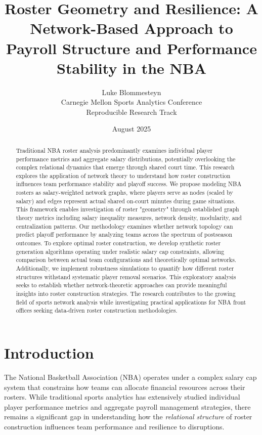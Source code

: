 \documentclass[11pt]{article}
\title{Roster Geometry and Resilience: A Network-Based Approach to Payroll Structure and Performance Stability in the NBA}
\author{Luke Blommesteyn\\
Carnegie Mellon Sports Analytics Conference\\
Reproducible Research Track}
\date{August 2025}
\begin{document}
\maketitle

\begin{abstract}
Traditional NBA roster analysis predominantly examines individual player performance metrics and aggregate salary distributions, potentially overlooking the complex relational dynamics that emerge through shared court time. This research explores the application of network theory to understand how roster construction influences team performance stability and playoff success. We propose modeling NBA rosters as salary-weighted network graphs, where players serve as nodes (scaled by salary) and edges represent actual shared on-court minutes during game situations. This framework enables investigation of roster "geometry" through established graph theory metrics including salary inequality measures, network density, modularity, and centralization patterns. Our methodology examines whether network topology can predict playoff performance by analyzing teams across the spectrum of postseason outcomes. To explore optimal roster construction, we develop synthetic roster generation algorithms operating under realistic salary cap constraints, allowing comparison between actual team configurations and theoretically optimal networks. Additionally, we implement robustness simulations to quantify how different roster structures withstand systematic player removal scenarios. This exploratory analysis seeks to establish whether network-theoretic approaches can provide meaningful insights into roster construction strategies. The research contributes to the growing field of sports network analysis while investigating practical applications for NBA front offices seeking data-driven roster construction methodologies.
\end{abstract}

\section{Introduction}

The National Basketball Association (NBA) operates under a complex salary cap system that constrains how teams can allocate financial resources across their rosters. While traditional sports analytics has extensively studied individual player performance metrics and aggregate payroll management strategies, there remains a significant gap in understanding how the \textit{relational structure} of roster construction influences team performance and resilience to disruptions.
\end{document}
